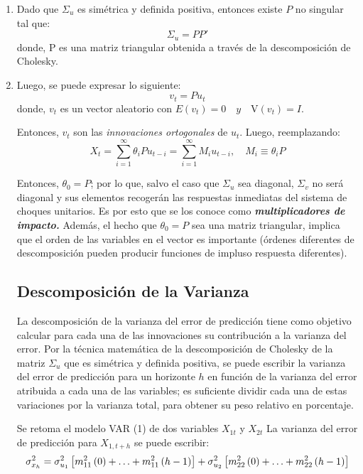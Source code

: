 \begin{enumerate}
      \item Dado que $\Sigma_{u}$ es sim\'{e}trica y definida positiva, entonces existe $P$ no singular tal que: 
      \[
      \Sigma_{u}=PP'
      \]
      donde, P es una matriz triangular obtenida a trav\'{e}s de la descomposici\'{o}n de Cholesky.
      
      \item Luego, se puede expresar lo siguiente:
      \[
      v_{t}=Pu_{t}
      \]
      donde, $v_{t}$ es un vector aleatorio con $E\left( v_{t} \right)=0\quad y \quad \mathrm{V}\left( v_{t} \right)=I$.

Entonces, $v_{t}$ son las \textit{innovaciones ortogonales} \quad de $u_{t}$. Luego, reemplazando: 
\[
X_{t}=\sum_{i=1}^\infty {\theta_{i}Pu_{t-i}} =\sum_{i=1}^\infty {M_{i}u_{t-i}},\quad M_{i}\equiv \theta_{i}P
\]

Entonces, $\theta_{0}=P$; por lo que, salvo el caso que $\Sigma_{u}$ sea diagonal, $\Sigma_{v}$ no ser\'{a} diagonal y sus elementos recoger\'{a}n las respuestas inmediatas del sistema de choques unitarios. Es por esto que se los conoce como \textbf{\textit{multiplicadores de impacto}}\textbf{\textit{. }}Adem\'{a}s, el hecho que $\theta_{0}=P$ sea una matriz triangular, implica que el orden de las variables en el vector es importante (\'{o}rdenes diferentes de descomposici\'{o}n pueden producir funciones de impluso respuesta diferentes). 

\subsection{Descomposici\'{o}n de la Varianza}
La descomposici\'{o}n de la varianza del error de predicci\'{o}n tiene como objetivo calcular para cada una de las innovaciones su contribuci\'{o}n a la varianza del error. Por la t\'{e}cnica matem\'{a}tica de la descomposici\'{o}n de Cholesky de la matriz $\Sigma_{u}$ que es sim\'{e}trica y definida positiva, se puede escribir la varianza del error de predicci\'{o}n para un horizonte $h$ en funci\'{o}n de la varianza del error atribuida a cada una de las variables; es suficiente dividir cada una de estas variaciones por la varianza total, para obtener su peso relativo en porcentaje.\newline

Se retoma el modelo VAR (1) de dos variables $X_{1t}$ y $X_{2t}$ La varianza del error de predicci\'{o}n para $X_{1,t+h}$ se puede escribir:
\[
\sigma_{x_{h}}^{2}=\sigma_{u_{1}}^{2}\left[ m_{11}^{2}\left( 0 \right)+\mathellipsis +m_{11}^{2}\left( h-1 \right) \right]+\sigma_{u_{2}}^{2}\left[ m_{22}^{2}\left( 0 \right)+\mathellipsis +m_{22}^{2}\left( h-1 \right) \right]
\]


\end{enumerate}
